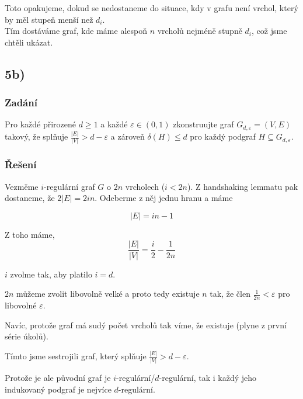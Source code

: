 \documentclass[../main.tex]{subfiles}
\begin{document}
Toto opakujeme, dokud se nedostaneme do situace, kdy v grafu není vrchol, který by měl stupeň menší než $d_i$.\\
Tím dostáváme graf, kde máme alespoň $n$ vrcholů nejméně stupně $d_i$, což jsme chtěli ukázat. 


\subsection{5b)}
\subsubsection*{Zadání}
Pro každé přirozené $d\geq 1$ a každé $\varepsilon\in(0,1)$ zkonstruujte graf $G_{d,\varepsilon}= (V,E)$
takový, že splňuje $\frac{|E|}{|V|} > d - \varepsilon$ a 
zároveň $\delta(H)\leq d$ pro každý podgraf $H \subseteq G_{d,\varepsilon}$.


\subsubsection*{Řešení}

Vezměme $i$-regulární graf $G$ o $2n$ vrcholech ($i<2n$).
Z handshaking lemmatu pak dostaneme, že $2|E| = 2in$. Odeberme z něj jednu hranu a máme 

\begin{equation*}
    |E| = in - 1
\end{equation*}

Z toho máme, 
\begin{equation*}
    \frac{|E|}{|V|} = \frac{i}{2} - \frac{1}{2n}
\end{equation*}

$i$ zvolme tak, aby platilo $i = d$. 

$2n$ můžeme zvolit libovolně velké a proto tedy existuje $n$ tak, že člen $\frac{1}{2n} < \varepsilon$ pro libovolné $\varepsilon$.

Navíc, protože graf má sudý počet vrcholů tak víme, že existuje (plyne z první série úkolů).

Tímto jsme sestrojili graf, který splňuje $\frac{|E|}{|V|} > d - \varepsilon$. 

Protože je ale původní graf je $i$-regulární/$d$-regulární, tak i každý jeho indukovaný podgraf je nejvíce $d$-regulární.
\end{document}
